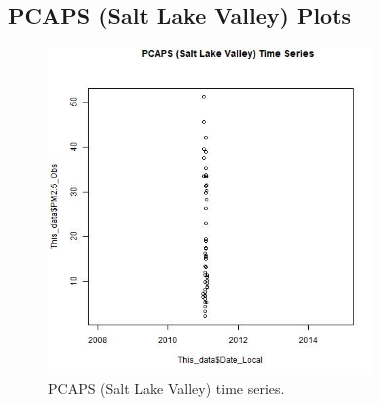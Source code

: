 
\subsection*{PCAPS (Salt Lake Valley) Plots}
\begin{figure} 
\centering 
\includegraphics[width=0.77\textwidth]{Code_Outputs/PCAPS_time_series.jpg} 
\caption{\label{fig:PCAPSTS}PCAPS (Salt Lake Valley) time series.} 
\end{figure} 
 
